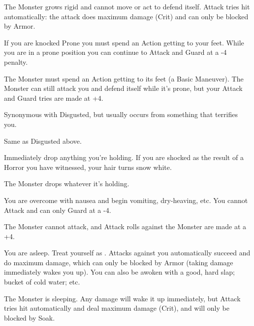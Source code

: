 \begin{multicols*}{2}
     The Monster grows rigid and cannot move or act to defend itself.  Attack tries hit automatically: the attack does maximum damage (Crit) and can only be blocked by Armor.


  If you are knocked Prone you must spend an Action getting to your feet.  While you are in a prone position you can continue to Attack and Guard at a -4 penalty.
  
    The Monster must spend an Action getting to its feet (a Basic Maneuver).  The Monster can still attack you and defend itself while it's prone, but your Attack and Guard tries are made at +4.


  Synonymous with Disgusted, but usually occurs from something that terrifies you.

   Same as Disgusted above.


  Immediately drop anything you're holding.  If you are shocked as the result of a Horror you have witnessed, your hair turns snow white.

     The Monster drops whatever it's holding.



  You are overcome with nausea and begin vomiting, dry-heaving, etc.  You cannot Attack and can only Guard at a -4.

     The Monster cannot attack, and Attack rolls against the Monster are made at a +4.

\newpage


  You are asleep.  Treat yourself as .  Attacks against you automatically succeed and do maximum damage, which can only be blocked by Armor (taking damage immediately wakes you up).  You can also be awoken with a good, hard slap; bucket of cold water; etc.

       The Monster is sleeping.  Any damage will wake it up immediately, but Attack tries hit automatically and deal maximum damage (Crit), and will only be blocked by Soak.



\end{multicols*}
